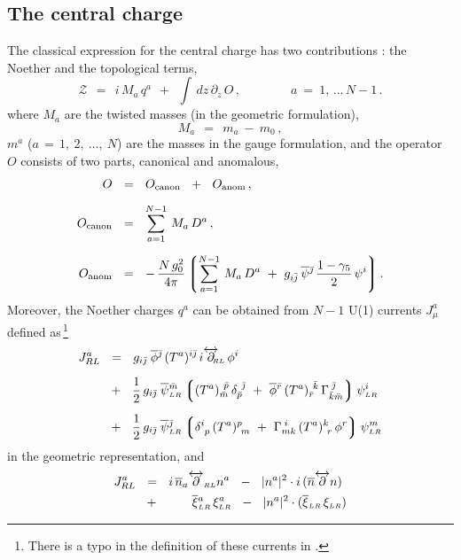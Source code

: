 \documentclass[epsfig,12pt]{article}
\def\beq{\begin{equation}}
\def\eeq{\end{equation}}
\def\beq{\begin{equation}}
\def\eeq{\end{equation}}
\newcommand{\p}{\partial}
\newcommand{\ov}{\overline}
\newcommand{\mc}[1]{\mathcal{#1}}
\newcommand{\lgr}{\left\lgroup}
\newcommand{\rgr}{\right\rgroup}
\newcommand{\bpsi}{\ov{\psi}{}}
\newcommand{\bphi}{\ov{\phi}{}}
\newcommand{\bxi}{\ov{\xi}{}}
\newcommand{\bj}{{\bar \jmath}}
\newcommand{\bmm}{{\bar m}}
\newcommand{\bp}{{\bar p}}
\newcommand{\bkk}{{\bar k}}
\newcommand{\br}{{\bar r}}
\begin{document}
\subsection{The central charge}

	The classical expression for the central charge has two contributions \cite{SVZw}:
	the Noether and the topological terms,
\beq
        \mc{Z} ~~=~~ i\, M_a\, q^a  ~~+~~ \int\, dz\, \p_z\, O \,, \qquad\qquad
	a ~=~ 1,\,...\, N-1\,.
	\label{21}
\eeq
	where $ M_a $ are the twisted masses (in the geometric formulation),
\beq
	M_a  ~~=~~ m_a ~-~ m_0\,,
\eeq
	$m^a$ ($a \,=\, 1,~2,~ ...,~N $) are the masses in the gauge formulation, 
	and the operator $O$ consists of two parts, canonical and anomalous,
\begin{align}
%
	O & ~~=~~ 
	O_{\rm canon} ~~+~~ O_{\rm anom}\,,
\\[2mm]
%
	O_{\rm canon } 
\label{23}
	& ~~=~~ 
	\sum_{a= 1}^{N-1}\, M_a\, D^a\,,
\\[2mm]
%
	O_{\rm anom} 
\label{24}
	& ~~=~~
	-\, \frac{N\, g_0^2}{4\pi} 
	\lgr
	\sum_{a=1}^{N-1}\, M_a\, D^a ~+~ g_{i\bar{j}} \,\bpsi{}^\bj\, \frac{1-\gamma_5}{2}\,\psi^i
	\rgr.
\end{align}
	Moreover, the Noether charges $ q^a $ can be obtained from $N-1$ U(1) currents $ J_\mu^a $
	defined as\,\footnote{There is a typo in the definition of these currents in \cite{SVZw}.}
\begin{align}
%
	J_{RL}^a  
	& ~~=~~
	 g_{i\bj}\; \bphi^\bj\, (T^a)^{i\bj}\, i\overleftrightarrow{\p}{}_{\scriptscriptstyle \!\!\!\!RL}\, \phi^i   
\nonumber
	\\[2mm]
%
        & 
	~~+~~
        \frac{1}{2}\, g_{i\bj}\; \bpsi{}_{\scriptscriptstyle LR}^\bmm 
        	\lgr  ( T^a )_\bmm^{\ \bp}\, \delta_\bp^{\ \bj} ~+~ 
		\bphi{}^\br\, (T^a)_\br^{\ \bkk}\, \Gamma^{\;\bj}_{\bkk\bmm} \rgr   \psi_{\scriptscriptstyle LR}^i 
\nonumber 
	\\[2mm]
%
        & 
	~~+~~
        \frac{1}{2}\, g_{i\bj}\; \bpsi{}_{\scriptscriptstyle LR}^\bj
               \lgr  \delta^i_{\ p}\, (T^a)^p_{\ m} ~+~ 
	             \Gamma_{mk}^{\;i}\, (T^a)^k_{\ r}\, \phi^r \rgr   \psi_{\scriptscriptstyle LR}^m
\label{u1cur}
\end{align}
	in the geometric representation, and
\begin{align}
%
\notag
       J_{RL}^a  & ~~=~~ i\, \ov{n}{}_a \overleftrightarrow{\p}_{\scriptscriptstyle RL} n^a 
                   ~~-~~ |n^a|^2 \cdot i\, ( \ov{n} \overleftrightarrow{\p} n ) \\
%
                 & ~~+~~ \qquad 
                         \bxi{}_{\scriptscriptstyle LR}^a\, \xi_{\scriptscriptstyle LR}^a  ~~-~~
                         |n^a|^2 \cdot ( \bxi{}_{\scriptscriptstyle LR}\, \xi_{\scriptscriptstyle LR} )
\end{align}
\end{document}
